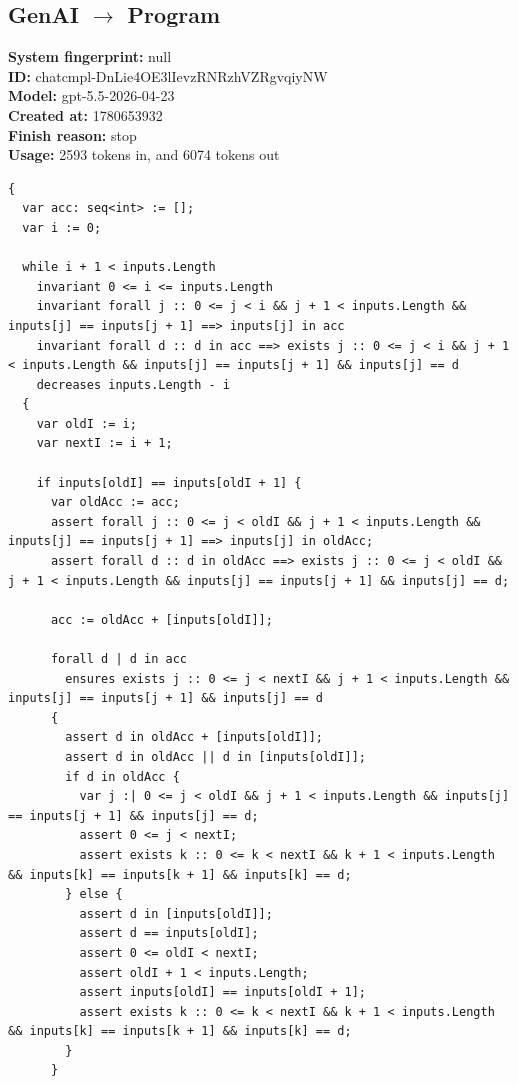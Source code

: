 \documentclass{article}
\begin{document}
\subsection*{GenAI $\rightarrow$ Program}
\textbf{System fingerprint: }null
\\\textbf{ID: }chatcmpl-DnLie4OE3lIevzRNRzhVZRgvqiyNW
\\\textbf{Model: }gpt-5.5-2026-04-23
\\\textbf{Created at: }1780653932
\\\textbf{Finish reason: }stop
\\\textbf{Usage: }2593 tokens in, and 6074 tokens out
\begin{lstlisting}
{
  var acc: seq<int> := [];
  var i := 0;

  while i + 1 < inputs.Length
    invariant 0 <= i <= inputs.Length
    invariant forall j :: 0 <= j < i && j + 1 < inputs.Length && inputs[j] == inputs[j + 1] ==> inputs[j] in acc
    invariant forall d :: d in acc ==> exists j :: 0 <= j < i && j + 1 < inputs.Length && inputs[j] == inputs[j + 1] && inputs[j] == d
    decreases inputs.Length - i
  {
    var oldI := i;
    var nextI := i + 1;

    if inputs[oldI] == inputs[oldI + 1] {
      var oldAcc := acc;
      assert forall j :: 0 <= j < oldI && j + 1 < inputs.Length && inputs[j] == inputs[j + 1] ==> inputs[j] in oldAcc;
      assert forall d :: d in oldAcc ==> exists j :: 0 <= j < oldI && j + 1 < inputs.Length && inputs[j] == inputs[j + 1] && inputs[j] == d;

      acc := oldAcc + [inputs[oldI]];

      forall d | d in acc
        ensures exists j :: 0 <= j < nextI && j + 1 < inputs.Length && inputs[j] == inputs[j + 1] && inputs[j] == d
      {
        assert d in oldAcc + [inputs[oldI]];
        assert d in oldAcc || d in [inputs[oldI]];
        if d in oldAcc {
          var j :| 0 <= j < oldI && j + 1 < inputs.Length && inputs[j] == inputs[j + 1] && inputs[j] == d;
          assert 0 <= j < nextI;
          assert exists k :: 0 <= k < nextI && k + 1 < inputs.Length && inputs[k] == inputs[k + 1] && inputs[k] == d;
        } else {
          assert d in [inputs[oldI]];
          assert d == inputs[oldI];
          assert 0 <= oldI < nextI;
          assert oldI + 1 < inputs.Length;
          assert inputs[oldI] == inputs[oldI + 1];
          assert exists k :: 0 <= k < nextI && k + 1 < inputs.Length && inputs[k] == inputs[k + 1] && inputs[k] == d;
        }
      }


\end{lstlisting}
\end{document}
